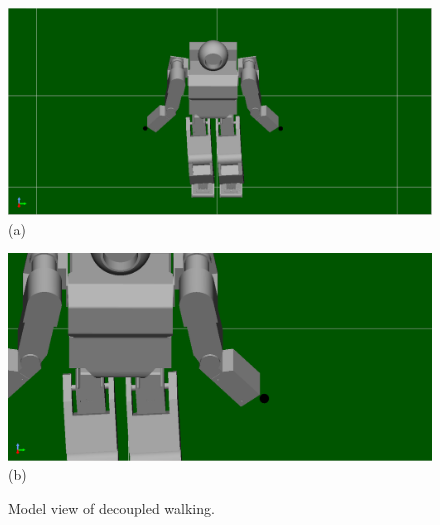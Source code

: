 \documentclass[11pt,a4paper]{jsarticle}
\begin{document}
\begin{figure}[h]
  \begin{minipage}{0.45\linewidth}
    \centering
    \includegraphics[width=1.0\linewidth]{./fig/decoupled.png}
    \footnotesize{\hspace{30pt}(a)}
  \end{minipage}
  \begin{minipage}{0.1\linewidth}
    \centering
    \hspace{-0.1mm}
  \end{minipage}
  \begin{minipage}{0.45\linewidth}
    \centering
    \includegraphics[width=1.0\linewidth]{./fig/decoupled2.png}
    \footnotesize{\hspace{30pt}(b)}
  \end{minipage}
  \caption{Model view of decoupled walking.}
  \label{fig:No1}
\end{figure}
\end{document}
